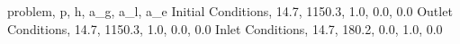 problem, p, h, a_g, a_l, a_e
Initial Conditions, 14.7, 1150.3, 1.0, 0.0, 0.0
Outlet Conditions, 14.7, 1150.3, 1.0, 0.0, 0.0
Inlet Conditions, 14.7, 180.2, 0.0, 1.0, 0.0